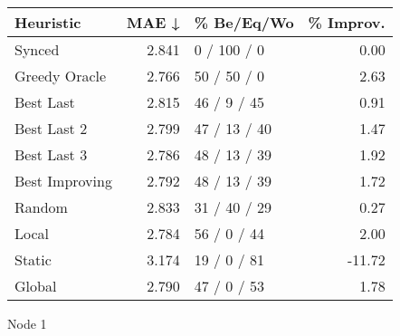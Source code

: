 \begin{tabular}{lrlr}
\toprule
\textbf{Heuristic} & \textbf{MAE ↓} & \textbf{\% Be/Eq/Wo} & \textbf{\% Improv.} \\
\midrule
            Synced &          2.841 &          0 / 100 / 0 &                0.00 \\
     Greedy Oracle &          2.766 &          50 / 50 / 0 &                2.63 \\
         Best Last &          2.815 &          46 / 9 / 45 &                0.91 \\
       Best Last 2 &          2.799 &         47 / 13 / 40 &                1.47 \\
       Best Last 3 &          2.786 &         48 / 13 / 39 &                1.92 \\
    Best Improving &          2.792 &         48 / 13 / 39 &                1.72 \\
            Random &          2.833 &         31 / 40 / 29 &                0.27 \\
             Local &          2.784 &          56 / 0 / 44 &                2.00 \\
            Static &          3.174 &          19 / 0 / 81 &              -11.72 \\
            Global &          2.790 &          47 / 0 / 53 &                1.78 \\
\bottomrule
\end{tabular}
\caption{Node 1}
\label{tab:ds_non_lr05_le1_bs4_1}
